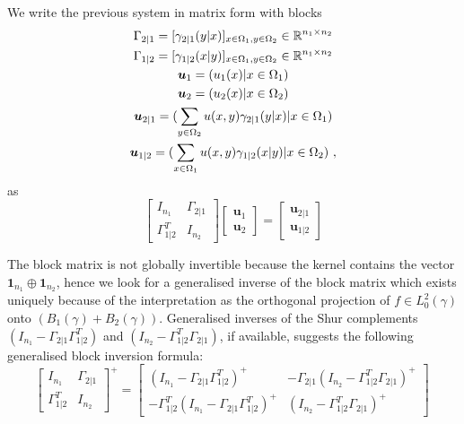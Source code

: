 \documentclass[runningheads]{llncs}
\begin{document}
We write the previous system in matrix form with blocks
\begin{gather*}
  \Gamma_{2|1} = [\gamma_{2|1}(y|x)]_{x \in \Omega_1, y \in \Omega_2} \in \mathbb R^{n_1 \times n_2} \\
  \Gamma_{1|2} = [\gamma_{1|2}(x|y)]_{x \in \Omega_1, y \in \Omega_2} \in \mathbb R^{n_1 \times n_2} \\
  \bm u_1 = (u_1(x) | x \in \Omega_1) \\
  \bm u_2 = (u_2(x) | x \in \Omega_2) \\
  \bm u_{2|1} = (\sum_{y \in \Omega_2} u(x,y)\gamma_{2|1}(y|x) | x \in \Omega_1) \\
  \bm u_{1|2} = (\sum_{x\in\Omega_1} u(x,y)\gamma_{1|2}(x|y) | x \in \Omega_2) \ ,
\end{gather*}
as 
\begin{equation}
\label{eq:block}
  \begin{bmatrix}
    I_{n_1} & \Gamma_{2|1} \\ \Gamma_{1|2}^T & I_{n_2}
  \end{bmatrix}
  \begin{bmatrix}
    \bm u_1 \\ \bm u_2
  \end{bmatrix}
=
\begin{bmatrix}
  \bm u_{2|1} \\ \bm u_{1|2}
\end{bmatrix}
\end{equation}

The block matrix is not globally invertible because the kernel contains the vector $\bm 1 _{n_1} \oplus \bm 1_{n_2}$, hence we look for a generalised inverse of the block matrix  which  exists uniquely because of the interpretation as the orthogonal projection of $f \in L_0^2(\gamma)$ onto $(B_1(\gamma) + B_2(\gamma))$. Generalised inverses of the Shur complements $(I_{n_1}-\Gamma_{2|1}\Gamma_{1|2}^T)$ and $(I_{n_2}-\Gamma_{1|2}^T\Gamma_{2|1})$, if available, suggests the following generalised block inversion formula:
%
\begin{equation}
\label{eq:blocksolve}
\begin{bmatrix}
    I_{n_1} & \Gamma_{2|1} \\ \Gamma_{1|2}^T & I_{n_2}
  \end{bmatrix} ^+ =
  \begin{bmatrix}
    (I_{n_1}-\Gamma_{2|1}\Gamma_{1|2}^T)^{+} & - \Gamma_{2|1} (I_{n_2}-\Gamma_{1|2}^T\Gamma_{2|1})^{+} \\
 - \Gamma_{1|2}^T (I_{n_1}-\Gamma_{2|1}\Gamma_{1|2}^T)^{+} & (I_{n_2}-\Gamma_{1|2}^T\Gamma_{2|1})^{+} 
\end{bmatrix} \ 
\end{equation}
\end{document}
